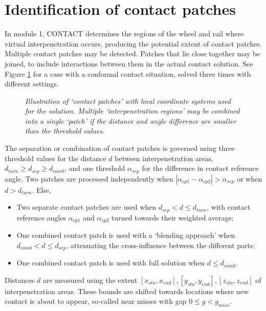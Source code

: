 \documentclass[12pt]{report}
\begin{document}
\section{Identification of contact patches}
\label{sec:cpatches}

In module 1, CONTACT determines the regions of the wheel and rail where
virtual interpenetration occurs, producing the potential extent of 
contact patches. Multiple contact patches may be detected. Patches that lie
close together may be joined, to include interactions between them in the
actual contact solution. See Figure \ref{fig:site_b_cpatch} for a case with
a conformal contact situation, solved three times with different settings.

\begin{figure}[bt]
\centering
{}
\caption{\em Illustration of `contact patches' with local coordinate
        systems used for the solution. Multiple `interpenetration regions'
        may be combined into a single `patch' if the distance and angle
        difference are smaller than the threshold values.}
\label{fig:site_b_cpatch}
\end{figure}

The separation or combination of contact patches is governed using three
threshold values for the distance $d$ between interpenetration areas,
$d_{turn}\ge d_{sep}\ge d_{comb}$, and one threshold $\alpha_{sep}$ for
the difference in contact reference angle. Two patches are processed
independently when $|\alpha_{cp1}- \alpha_{cp2}| > \alpha_{sep}$ or when
$d > d_{turn}$. Else,
\begin{itemize}
\item Two separate contact patches are used when $d_{sep} < d\le
        d_{turn}$, with contact reference angles $\alpha_{cp1}$ and
        $\alpha_{cp2}$ turned towards their weighted average;
\item One combined contact patch is used with a `blending approach'
        when $d_{comb}< d\le d_{sep}$, attenuating the cross-influence
        between the different parts;
\item One combined contact patch is used with full solution when $d\le
        d_{comb}$.
\end{itemize}
Distances $d$ are measured using the extent $[x_{sta},x_{end}],
[y_{sta},y_{end}], [z_{sta},z_{end}]$ of interpenetration areas. These
bounds are shifted towards locations where new contact is about to appear,
so-called near misses with gap $0\le g<g_{miss}$.
\end{document}
